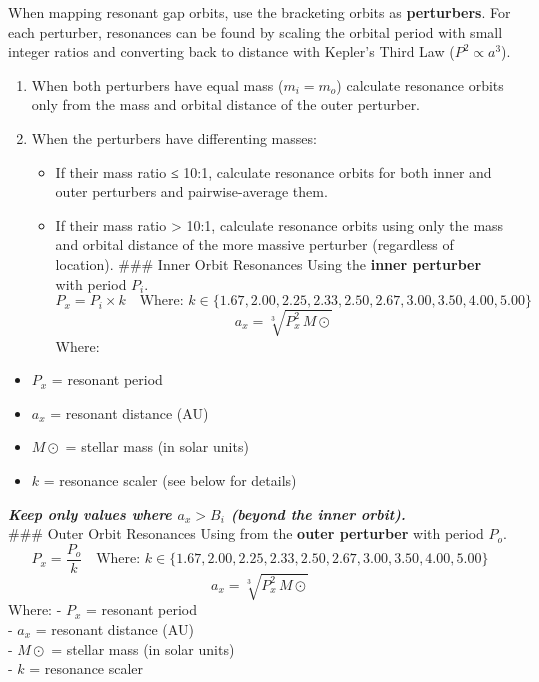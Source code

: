 \documentclass[
  letterpaper,
]{book}
\providecommand{\tightlist}{%
  \setlength{\itemsep}{0pt}\setlength{\parskip}{0pt}}
\begin{document}
When mapping resonant gap orbits, use the bracketing orbits as
\textbf{perturbers}. For each perturber, resonances can be found by
scaling the orbital period with small integer ratios and converting back
to distance with Kepler's Third Law (\(P^2 \propto a^3\)).

\begin{enumerate}
\def\labelenumi{\arabic{enumi}.}
\tightlist
\item
  When both perturbers have equal mass (\(m_i = m_o\)) calculate
  resonance orbits only from the mass and orbital distance of the outer
  perturber.
\item
  When the perturbers have differenting masses:

  \begin{itemize}
  \tightlist
  \item
    If their mass ratio ≤ 10:1, calculate resonance orbits for both
    inner and outer perturbers and pairwise-average them.
  \item
    If their mass ratio \textgreater{} 10:1, calculate resonance orbits
    using only the mass and orbital distance of the more massive
    perturber (regardless of location). \#\#\# Inner Orbit Resonances
    Using the \textbf{inner perturber} with period \(P_i\).\\
    \[
    P_x = P_i \times k \quad \text{Where: } k \in \{1.67, 2.00, 2.25, 2.33, 2.50, 2.67, 3.00, 3.50, 4.00, 5.00\}
    \]\[
    a_x = \sqrt[3]{P_x^2 \, M\odot}
    \] Where:
  \end{itemize}
\end{enumerate}

\begin{itemize}
\tightlist
\item
  \(P_x\) = resonant period\\
\item
  \(a_x\) = resonant distance (AU)\\
\item
  \(M\odot\) = stellar mass (in solar units)\\
\item
  \(k\) = resonance scaler (see below for details)
\end{itemize}

\textbf{\emph{Keep only values where \(a_x > B_i\) (beyond the inner
orbit).}}\\
\#\#\# Outer Orbit Resonances Using from the \textbf{outer perturber}
with period \(P_o\).\\
\[
P_x = \frac{P_o}{k} \quad \text{Where: } k \in \{1.67, 2.00, 2.25, 2.33, 2.50, 2.67, 3.00, 3.50, 4.00, 5.00\}
\]\[
a_x = \sqrt[3]{P_x^2 \, M\odot}
\]Where: - \(P_x\) = resonant period\\
- \(a_x\) = resonant distance (AU)\\
- \(M\odot\) = stellar mass (in solar units)\\
- \(k\) = resonance scaler
\end{document}
